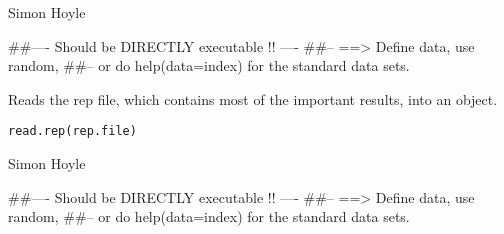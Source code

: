 \documentclass[a4paper]{book}
\begin{document}
%
\begin{Arguments}
\begin{ldescription}
\item[\code{par.file}] 


\end{ldescription}
\end{Arguments}
%
\begin{Author}\relax

Simon Hoyle
\end{Author}
%
\begin{Examples}
\begin{ExampleCode}
##---- Should be DIRECTLY executable !! ----
##-- ==>  Define data, use random,
##--	or do  help(data=index)  for the standard data sets.

\end{ExampleCode}
\end{Examples}
%
\begin{Description}\relax

Reads the rep file, which contains most of the important results, into an object. 
\end{Description}
%
\begin{Usage}
\begin{verbatim}
read.rep(rep.file)
\end{verbatim}
\end{Usage}
%
\begin{Arguments}
\begin{ldescription}
\item[\code{rep.file}] 


\end{ldescription}
\end{Arguments}
%
\begin{Author}\relax

Simon Hoyle
\end{Author}
%
\begin{Examples}
\begin{ExampleCode}
##---- Should be DIRECTLY executable !! ----
##-- ==>  Define data, use random,
##--	or do  help(data=index)  for the standard data sets.

\end{ExampleCode}
\end{Examples}
\end{document}
